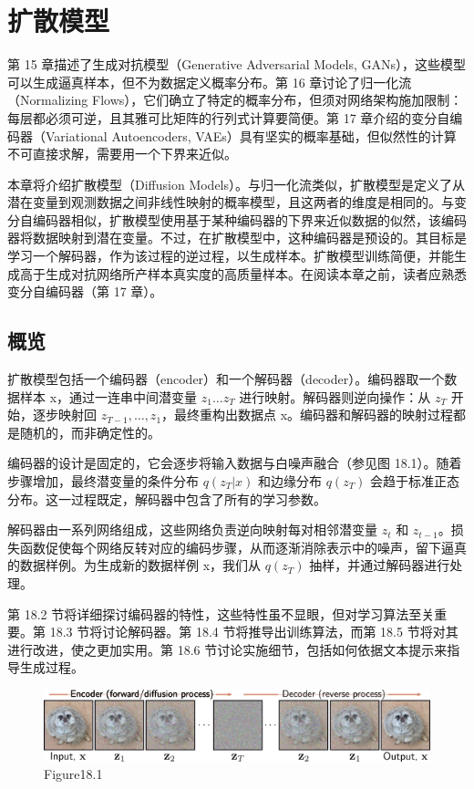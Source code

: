\chapter{扩散模型}

第 15 章描述了生成对抗模型（Generative Adversarial Models, GANs），这些模型可以生成逼真样本，但不为数据定义概率分布。第 16 章讨论了归一化流（Normalizing Flows），它们确立了特定的概率分布，但须对网络架构施加限制：每层都必须可逆，且其雅可比矩阵的行列式计算要简便。第 17 章介绍的变分自编码器（Variational Autoencoders, VAEs）具有坚实的概率基础，但似然性的计算不可直接求解，需要用一个下界来近似。

本章将介绍扩散模型（Diffusion Models）。与归一化流类似，扩散模型是定义了从潜在变量到观测数据之间非线性映射的概率模型，且这两者的维度是相同的。与变分自编码器相似，扩散模型使用基于某种编码器的下界来近似数据的似然，该编码器将数据映射到潜在变量。不过，在扩散模型中，这种编码器是预设的。其目标是学习一个解码器，作为该过程的逆过程，以生成样本。扩散模型训练简便，并能生成高于生成对抗网络所产样本真实度的高质量样本。在阅读本章之前，读者应熟悉变分自编码器（第 17 章）。

\section{概览}
扩散模型包括一个编码器（encoder）和一个解码器（decoder）。编码器取一个数据样本 x，通过一连串中间潜变量 \(z_1 \ldots z_T\) 进行映射。解码器则逆向操作：从 \(z_T\) 开始，逐步映射回 \(z_{T-1}, \ldots, z_1\)，最终重构出数据点 x。编码器和解码器的映射过程都是随机的，而非确定性的。

编码器的设计是固定的，它会逐步将输入数据与白噪声融合（参见图 18.1）。随着步骤增加，最终潜变量的条件分布 \(q(z_T|x)\) 和边缘分布 \(q(z_T)\) 会趋于标准正态分布。这一过程既定，解码器中包含了所有的学习参数。

解码器由一系列网络组成，这些网络负责逆向映射每对相邻潜变量 \(z_t\) 和 \(z_{t-1}\)。损失函数促使每个网络反转对应的编码步骤，从而逐渐消除表示中的噪声，留下逼真的数据样例。为生成新的数据样例 x，我们从 \(q(z_T)\) 抽样，并通过解码器进行处理。

第 18.2 节将详细探讨编码器的特性，这些特性虽不显眼，但对学习算法至关重要。第 18.3 节将讨论解码器。第 18.4 节将推导出训练算法，而第 18.5 节将对其进行改进，使之更加实用。第 18.6 节讨论实施细节，包括如何依据文本提示来指导生成过程。

\begin{figure}[ht!]
\centering
\includegraphics[width=0.7\linewidth]{png/chapter18/DiffusionOverview.png}
\caption{Figure18.1}
\end{figure}

